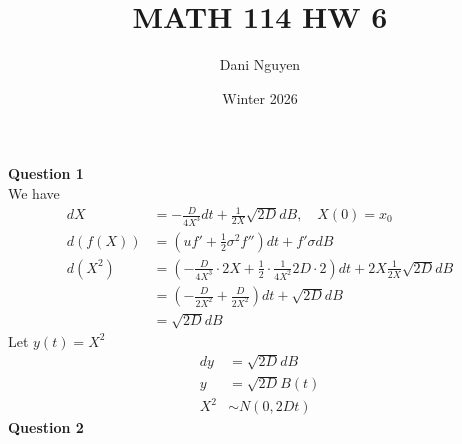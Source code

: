 \documentclass[12pt, letterpaper]{article}
\title{MATH 114 HW 6}
\author{Dani Nguyen}
\date{Winter 2026}
\begin{document}
\maketitle
\graphicspath{ {./} }

\noindent \textbf{Question 1} \\
We have
\begin{align*}
    dX &= -\frac{D}{4X^3}dt + \frac{1}{2X}\sqrt{2D}dB,\quad X(0) = x_0 \\
    d(f(X)) &= \left(uf' + \frac 12 \sigma^2 f''\right)dt + f'\sigma dB \\
    d(X^2) &= \left(-\frac{D}{4X^3} \cdot 2X + \frac 12 \cdot \frac{1}{4X^2}2D\cdot 2 \right)dt + 2X \frac{1}{2X}\sqrt{2D}dB \\
    &= \left( -\frac{D}{2X^2} + \frac{D}{2X^2} \right)dt + \sqrt{2D}dB \\
    &= \sqrt{2D}dB
\end{align*}
Let $y(t) = X^2$
\begin{align*}
    dy &= \sqrt{2D}dB \\
    y &= \sqrt{2D}B(t) \\
    X^2 &\sim N(0,2Dt)
\end{align*}
\newpage
\noindent \textbf{Question 2} 
\end{document}
